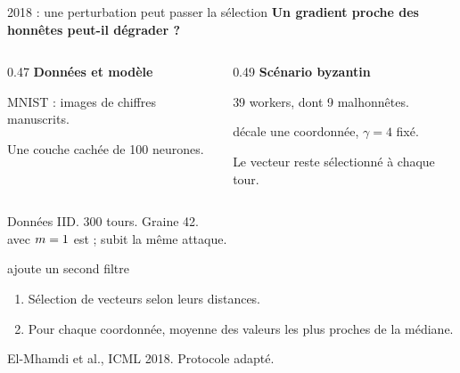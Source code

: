 \begin{frame}{2018 : une perturbation peut passer la sélection}
    \textbf{Un gradient proche des honnêtes peut-il dégrader \krum{} ?}
    \medskip
    \begin{columns}[T,onlytextwidth]
        \begin{column}{0.47\textwidth}
            \textbf{Données et modèle}
            \par MNIST : images de chiffres manuscrits.
            \par Une couche cachée de 100 neurones.
        \end{column}
        \begin{column}{0.49\textwidth}
            \textbf{Scénario byzantin}
            \par 39 workers, dont 9 malhonnêtes.
            \par \smallperturbation{} décale une coordonnée, $\gamma=4$ fixé.
            \par Le vecteur reste sélectionné à chaque tour.
        \end{column}
    \end{columns}
    \smallskip
    Données IID. 300 tours. Graine 42.\\
    \mkrum{} avec $m=1$ est \krum{} ; \bulyan{} subit la même attaque.
    \begin{block}{\bulyan{} ajoute un second filtre}
        \begin{enumerate}
            \item Sélection de vecteurs selon leurs distances.
            \item Pour chaque coordonnée, moyenne des valeurs les plus proches de la médiane.
        \end{enumerate}
    \end{block}
    {\footnotesize El-Mhamdi et al., ICML 2018. Protocole adapté.\par}
\end{frame}

